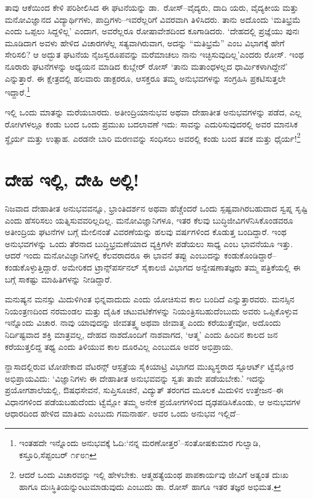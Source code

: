 ತಾವು ಆಕೆಯಿಂದ ಕೇಳಿ ಪರಿಶೀಲಿಸಿದ ಈ ಘಟನೆಯನ್ನು ಡಾ.\ ರೋಸ್​–ವೈದ್ಯರು, ದಾದಿ ಯರು, ವೈದ್ಯಕೀಯ ಮತ್ತು ಮನೋವಿಜ್ಞಾನದ ವಿದ್ಯಾರ್ಥಿಗಳು, ಪಾದ್ರಿಗಳು–ಇವರೆಲ್ಲರಿಗೆ ವಿವರವಾಗಿ ತಿಳಿಸಿದರು. ತಾನು ಅದೊಂದು ‘ಮತಿಭ್ರಮೆ ಎಂದು ಒಪ್ಪಲು ಸಿದ್ದಳಿಲ್ಲ’ ಎಂದಾಗ, ಅವರೆಲ್ಲರೂ ರೋಷಾವೇಶದಿಂದ ಕೂಗಾಡಿದರು. ‘ದೇಹದಲ್ಲಿ ಪ್ರಜ್ಞೆಯು ಪುನಃ ಮೂಡಿದಾಗ ಅವಳು ಹೇಳಿದ ವಿಚಾರಗಳೆಲ್ಲ ಸತ್ಯವಾಗಿರುವಾಗ, ಅದನ್ನು “ಮತಿಭ್ರಮೆ” ಎಂಬ ವಿಭಾಗಕ್ಕೆ ಹೇಗೆ ಸೇರಿಸಲಿ? ಆ ಅದ್ಭುತ ಘಟನೆಯ ನೈಜಸ್ವರೂಪವನ್ನು ಮರೆಮಾಚಲು ನಾನು ಇಚ್ಛಿಸುವುದಿಲ್ಲ’\break ಎಂದರು ರೋಸ್. ಇಂಥ ನೂರಾರು ಘಟನೆಗಳನ್ನು ಅಧ್ಯಯನ ಮಾಡಿದ ಕುಬ್ಲೇರ್ ರೋಸ್ ‘ತಾನು ಮತಾಂಧಳಲ್ಲದ ಧಾರ್ಮಿಕಳಾಗಿದ್ದೇನೆ’ ಎನ್ನುತ್ತಾರೆ. ಈ ಕ್ಷೇತ್ರದಲ್ಲಿ ಹಲವಾರು ಡಾಕ್ಟರರೂ, ಆಸಕ್ತರೂ ತಮ್ಮ ಅನುಭವಗಳನ್ನು ಸಂಗ್ರಹಿಸಿ ಪ್ರಕಟಿಸುತ್ತಲೇ ಇದ್ದಾರೆ.\footnote{ ಇಂತಹದೇ ಇನ್ನೊಂದು ಅನುಭವಕ್ಕೆ ಓದಿ:‘ನನ್ನ ಮರಣೋತ್ತರ’–ಸಂತೋಷಕುಮಾರ ಗುಲ್ವಾಡಿ, ಕಸ್ತೂರಿ,\break ಸೆಪ್ಟಂಬರ್ ೧೯೮೧}

ಇಲ್ಲಿ ಒಂದು ಮಾತನ್ನು ಮರೆಯಬಾರದು. ಅತೀಂದ್ರಿಯಾನುಭವ ಅಥವಾ ದೇಹಾತೀತ ಅನುಭವಗಳನ್ನು ಪಡೆದ, ಎಲ್ಲ ರೋಗಿಗಳಲ್ಲೂ ಕಂಡು ಬಂದ ಒಂದು ಪ್ರಮುಖ ಬದಲಾವಣೆ ಇದು: ಸಾವನ್ನು ಎದುರಿಸುವುದರಲ್ಲಿ ಅವರ ಮಾನಸಿಕ ಸ್ಥೈರ್ಯ ಮತ್ತು ಉತ್ಸಾಹ. ಎರಡನೇ ಬಾರಿ ಮರಣವನ್ನು ಸಂಧಿಸಲು ಅವರಲ್ಲಿ ಕಂಡು ಬಂದ ತವಕ ಮತ್ತು ಧೈರ್ಯ!\footnote{ ಆದರೆ ಒಂದು ವಿಚಾರವನ್ನು ಇಲ್ಲಿ ಹೇಳಬೇಕು. ಆತ್ಮಹತ್ಯೆಯಂಥ ಪಾಪಕಾರ್ಯವು ಜೀವಿಗೆ ಅತ್ಯಂತ ದುಃಖ ಹಾಗೂ ದುಃಸ್ಥಿತಿಯನ್ನುಂಟುಮಾಡುವುದು ಎಂಬುದು ಡಾ. ರೋಸ್ ಹಾಗೂ ಇತರ ತಜ್ಞರ ಅಭಿಮತ.}


\section*{ದೇಹ ಇಲ್ಲಿ, ದೇಹಿ ಅಲ್ಲಿ!}


ನಿಜವಾದ ದೇಹಾತೀತ ಅನುಭವವನ್ನೂ, ಭ್ರಾಂತಿದರ್ಶನ ಅಥವಾ ಹೆಚ್ಚೆಂದರೆ ಒಂದು ಸ್ಪಷ್ಟ\-ವಾಗಿರ\-ಬಹುದಾದ ಸ್ವಪ್ನ ಸೃಷ್ಟಿ ಎಂದು ಹೆಸರಿಸಲು ಯತ್ನಿಸುವವರಿಲ್ಲದಿಲ್ಲ. ಮನೋವಿಜ್ಞಾನಿಗಳೂ, ಇತರ ಕೆಲವು ಬುದ್ಧಿಜೀವಿಗಳೆನಿಸಿಕೊಂಡವರೂ ಅತೀಂದ್ರಿಯ ಘಟನೆಗಳ ಬಗ್ಗೆ ಮೇಲಿನಂತೆ ವಿವರಣೆಯನ್ನು ಹಲವು ವರ್ಷಗಳಿಂದ ಕೊಡುತ್ತ ಬಂದಿದ್ದಾರೆ. ಇಂಥ ಅನುಭವಗಳನ್ನು ಒಂದು ತೆರನಾದ ಬುದ್ಧಿಭ್ರಮಣೆಯಾದ ವ್ಯಕ್ತಿಗಳೇ ಪಡೆಯಲು ಸಾಧ್ಯ ಎಂಬ ಭಾವನೆಯೂ ಇತ್ತು. ಆದರೆ ಇಂದು ಮನೋವಿಜ್ಞಾನಿಗಳಲ್ಲಿ ಕೆಲವರಾದರೂ ಈ ಭಾವನೆ ತಪ್ಪು ಎಂಬುದನ್ನು ಕಂಡುಕೊಂಡಿದ್ದಾರೆ–ಕಂಡುಕೊಳ್ಳುತ್ತಿದ್ದಾರೆ. ಅಮೇರಿಕದ ಟ್ರಾನ್ಸ್​ಪರ್ಸನಲ್ ಸೈಕಾಲಜಿ ವಿಭಾಗದ ಅನ್ವೇಷಣಾತಜ್ಞರು ತಮ್ಮ ಪತ್ರಿಕೆಯಲ್ಲಿ ಈ ಬಗ್ಗೆ ಸಾಕಷ್ಟು ಮಾಹಿತಿಗಳನ್ನು ನೀಡಿದ್ದಾರೆ.

ಮನುಷ್ಯನ ಮನಸ್ಸು ಮಿದುಳಿಗಿಂತ ಭಿನ್ನವಾದುದು ಎಂದು ಯೋಚಿಸುವ ಕಾಲ ಬಂದಿದೆ ಎನ್ನುತ್ತಾರವರು. ಮನಸ್ಸಿನ ನಿಯಂತ್ರಣದಿಂದ ನರಮಂಡಲ ಮತ್ತು ದೈಹಿಕ ಚಟುವಟಿಕೆಗಳನ್ನು ನಿಯಂತ್ರಿಸಬಹುದೆಂಬುದು ಅವರು ಒಪ್ಪಿಕೊಳ್ಳುವ ಇನ್ನೊಂದು ವಿಚಾರ. ನಾವು ಯಾವುದನ್ನು ಜೀವತತ್ತ್ವ ಅಥವಾ ಜೀವಾತ್ಮ ಎಂದು ಕರೆಯುತ್ತೇವೋ, ಅದೊಂದು ನಿರ್ದಿಷ್ಟವಾದ ಶಕ್ತಿ ಮಾತ್ರವಲ್ಲ, ದೇಹದ ನಾಶದೊಂದಿಗೆ ನಾಶವಾಗದ, ‘ಆತ್ಮ’ ಎಂದು ಹಿಂದಿನ ಕಾಲದ ಜನ ಕರೆಯುತ್ತಲಿದ್ದ ತಥ್ಯ ಎಂದು ತಿಳಿಯುವ ಕಾಲ ದೂರವಿಲ್ಲ ಎಂಬುದೂ ಅವರ ಅಭಿಪ್ರಾಯ.

ನ್ಹಾಸಾದಲ್ಲಿರುವ ಟೋಪೇಕಾದ ವೆಟರನ್ಸ್ ಆಸ್ಪತ್ರೆಯ ಸೈಕಿಯಾಟ್ರಿ ವಿಭಾಗದ ಮುಖ್ಯಸ್ಥರಾದ ಸ್ಟೂಆರ್ಟ್ ಟ್ವೆಮ್ಲೋರ ಅಭಿಪ್ರಾಯವಿದು: ‘ವಿಜ್ಞಾನಿಗಳು ಈ ದೇಹಾತೀತ ಅನುಭವವನ್ನು ಸ್ವತಃ ತಾವೇ ಪಡೆಯಬೇಕು.’ ಇದನ್ನು ಪ್ರಯೋಗಶಾಲೆಯಲ್ಲಿ, ಔಷಧಸೇವನೆ, ಸುಪ್ತಿಸೂಚನೆ, ವಿದ್ಯುತ್ ತರಂಗದ ಮೂಲಕ ಮಿದುಳಿನ ಉತ್ತೇಜನ–ಈ ವಿಧಾನಗಳಿಂದ ಪಡೆಯಬಹುದೆಂದು ಟ್ವೆಮ್ಲೋ ತಮ್ಮ ಅನೇಕ ಪ್ರಯೋಗಗಳಿಂದ ದೃಢಪಡಿಸಿಕೊಂಡು, ಆ ಅನುಭವಗಳ ಆಧಾರದಿಂದ ಹೇಳಿದ ಮಾತಿದು ಎಂಬುದು ಗಮನಾರ್ಹ. ಅವರ ಒಂದು ಅನುಭವ ಇಲ್ಲಿದೆ–

